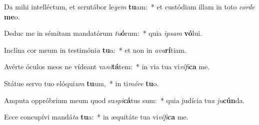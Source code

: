 \item Da mihi intelléctum, et scrutábor le\textit{gem} \textbf{tu}am:~* et custódiam illam in toto \textit{cor}\textit{de} \textbf{me}o.
\item Deduc me in sémitam mandatórum \textit{tu}\textbf{ó}rum:~* quia \textit{ip}\textit{sam} \textbf{vó}lui.
\item Inclína cor meum in testimóni\textit{a} \textbf{tu}a:~* et non in \textit{a}\textit{va}\textbf{rí}tiam.
\item Avérte óculos meos ne vídeant va\textit{ni}\textbf{tá}tem:~* in via tua vi\textit{ví}\textit{fi}\textbf{ca} me.
\item Státue servo tuo elóqui\textit{um} \textbf{tu}um,~* in ti\textit{mó}\textit{re} \textbf{tu}o.
\item Amputa oppróbrium meum quod su\textit{spi}\textbf{cá}tus sum:~* quia judícia tu\textit{a} \textit{ju}\textbf{cún}da.
\item Ecce concupívi mandá\textit{ta} \textbf{tu}a:~* in æquitáte tua vi\textit{ví}\textit{fi}\textbf{ca} me.
